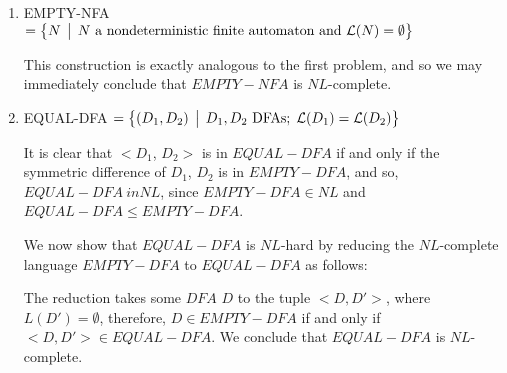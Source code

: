\documentclass[12pt]{article}
\begin{document}
\begin{enumerate}
\vspace*{.1in}

\item EMPTY-NFA $ = \bigl\{ N \,\bigm|\, N \mbox{ a nondeterministic finite automaton and } {\cal L}(N) =\emptyset \bigr\}$

This construction is exactly analogous to the first problem, and so we may immediately conclude that $EMPTY-NFA$ is $NL$-complete.

\vspace*{.1in}

\item EQUAL-DFA $ =  \bigl\{ (D_1,D_2) \,\bigm|\, D_1,D_2 \mbox{ DFAs};\;{\cal L}(D_1) ={\cal L}(D_2) \bigr\}$

It is clear that $< D_1$, $D_2 >$ is in $EQUAL-DFA$ if and only if the symmetric difference of $D_1$, $D_2$ is in $EMPTY-DFA$, and so, $EQUAL-DFA \ in NL$, since $EMPTY-DFA \in NL$ and $EQUAL-DFA \leq EMPTY-DFA$.

We now show that $EQUAL-DFA$ is $NL$-hard by reducing the $NL$-complete language $EMPTY-DFA$ to $EQUAL-DFA$ as follows:

The reduction takes some $DFA$ $D$ to the tuple $< D, D'>$, where $L(D') = \emptyset$, therefore, $D \in EMPTY-DFA$ if and only if $<D, D'> \in EQUAL-DFA$. We conclude that $EQUAL-DFA$ is $NL$-complete.

\end{enumerate}
\end{document}
